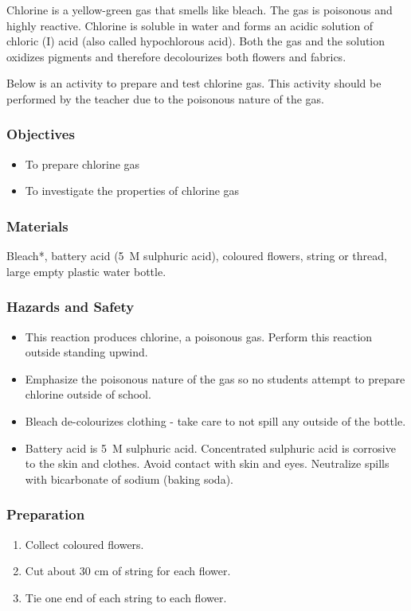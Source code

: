 Chlorine is a yellow-green gas that smells like bleach. The gas is poisonous and highly reactive. Chlorine is soluble in water and forms an acidic solution of chloric (I) acid (also called hypochlorous acid). Both the gas and the solution oxidizes pigments and therefore decolourizes both flowers and fabrics.

Below is an activity to prepare and test chlorine gas. This activity should be performed by the teacher due to the poisonous nature of the gas.

\subsubsection*{Objectives}
\begin{itemize}
\item{To prepare chlorine gas}
\item{To investigate the properties of chlorine gas}
\end{itemize}

\subsubsection*{Materials}
Bleach*, battery acid (5~M sulphuric acid), coloured flowers, string or thread, large empty plastic water bottle.

\subsubsection*{Hazards and Safety}
\begin{itemize}
\item{This reaction produces chlorine, a poisonous gas. Perform this reaction outside standing upwind.}
\item{Emphasize the poisonous nature of the gas so no students attempt to prepare chlorine outside of school.}
\item{Bleach de-colourizes clothing - take care to not spill any outside of the bottle.}
\item{Battery acid is 5~M sulphuric acid. Concentrated sulphuric acid is corrosive to the skin and clothes. Avoid contact with skin and eyes. Neutralize spills with bicarbonate of sodium (baking soda).}
\end{itemize}

\subsubsection*{Preparation}
\begin{enumerate}
\item{Collect coloured flowers.}
\item{Cut about 30 cm of string for each flower.}
\item{Tie one end of each string to each flower.}
\end{enumerate}

